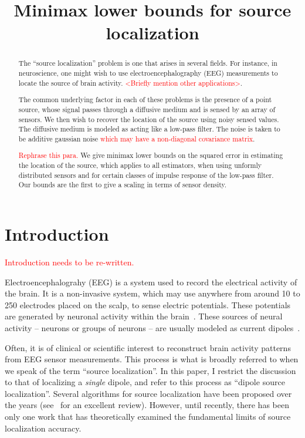 \documentclass[conference]{IEEEtran}
\title{Minimax lower bounds for source localization}
\author{
	\IEEEauthorblockN{
		Praveen Venkatesh\IEEEauthorrefmark{1}
		and Pulkit Grover\IEEEauthorrefmark{2}
	}
	\IEEEauthorblockA{
		Electrical \& Computer Engineering,
		and the Center for the Neural Basis of Cognition,
		Carnegie Mellon University \\
		\IEEEauthorrefmark{1}\href{mailto:vpraveen@cmu.edu}{\texttt{vpraveen@cmu.edu}}
		\IEEEauthorrefmark{2}\href{mailto:pulkit@cmu.edu}{\texttt{pulkit@cmu.edu}}
	}
}
\begin{document}
\maketitle
\thispagestyle{plain}
\pagestyle{plain}

\begin{abstract}

The ``source localization'' problem is one that arises in several fields. For
instance, in neuroscience, one might wish to use electroencephalography (EEG)
measurements to locate the source of brain activity.
\textcolor{red}{<Briefly mention other applications>}.

The common underlying factor in each of these problems is the presence of a
point source, whose signal passes through a diffusive medium and is sensed by
an array of sensors. We then wish to recover the location of the source using
noisy sensed values. The diffusive medium is modeled as acting like a low-pass
filter. The noise is taken to be additive gaussian noise \textcolor{red}{which
may have a non-diagonal covariance matrix}.

\textcolor{red}{Rephrase this para.}
We give minimax lower bounds on the squared error in estimating the location of
the source, which applies to all estimators, when using unformly distributed
sensors and for certain classes of impulse response of the low-pass filter. Our
bounds are the first to give a scaling in terms of sensor density.

\end{abstract}

\section{Introduction}

\textcolor{red}{Introduction needs to be re-written.}

Electroencephalograhy (EEG) is a system used to record the electrical activity
of the brain. It is a non-invasive system, which may use anywhere from around
10 to 250 electrodes placed on the scalp, to sense electric potentials. These
potentials are generated by neuronal activity within the
brain~\cite{Buzsaki2012Origin}. These sources of neural activity -- neurons or
groups of neurons -- are usually modeled as current
dipoles~\cite{Nunez2006Electric}.

Often, it is of clinical or scientific interest to reconstruct brain activity
patterns from EEG sensor measurements. This process is what is broadly referred
to when we speak of the term ``source localization''. In this paper, I restrict
the discussion to that of localizing a \emph{single} dipole, and refer to this
process as ``dipole source localization''. Several algorithms for source
localization have been proposed over the years
(see~\cite{Baillet2001Electromagnetic} for an excellent review). However, until
recently, there has been only one work that has theoretically examined the
fundamental limits of source localization accuracy.
\end{document}
